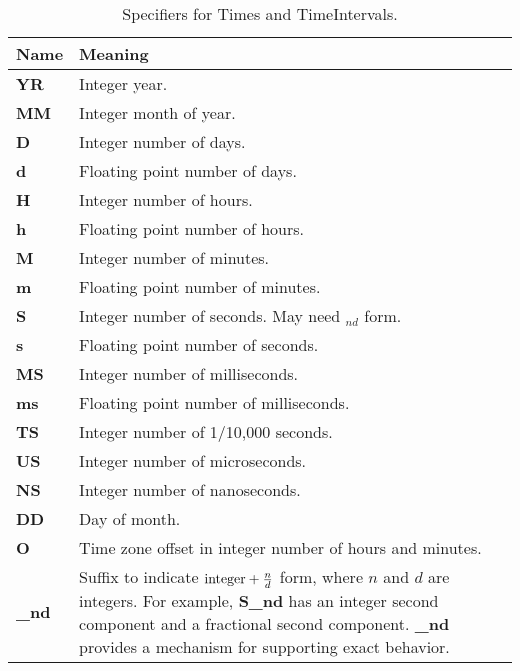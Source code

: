 \begin{center}
\begin{table}
\caption{\label{time-abbrevs}Specifiers for Times and TimeIntervals.}
\begin{tabular}{|p{1in}|p{3.5in}|}
\hline
Name & Meaning \\
\hline\hline
{\bf YR} & Integer year. \\
\hline
{\bf MM} & Integer month of year. \\
\hline
{\bf D} & Integer number of days. \\
\hline
{\bf d} & Floating point number of days. \\
\hline
{\bf H} & Integer number of hours. \\
\hline
{\bf h} & Floating point number of hours. \\
\hline
{\bf M} & Integer number of minutes. \\
\hline
{\bf m} & Floating point number of minutes. \\
\hline
{\bf S} & Integer number of seconds. May need $_{nd}$ form.\\
\hline
{\bf s} & Floating point number of seconds. \\
\hline
{\bf MS} & Integer number of milliseconds. \\
\hline
{\bf ms} & Floating point number of milliseconds. \\
\hline
{\bf TS} & Integer number of 1/10,000 seconds. \\
\hline
{\bf US} & Integer number of microseconds. \\
\hline
{\bf NS} & Integer number of nanoseconds. \\
\hline
{\bf DD} & Day of month. \\
\hline
{\bf O} & Time zone offset in integer number of hours and minutes. \\
\hline
{\bf \_nd} & Suffix to indicate {\bf $ {\rm integer} + \frac{n}{d}$} form,
where $n$ and $d$ are integers. For example, {\bf S\_nd} has an integer
second component and a fractional second component. {\bf \_nd} provides 
a mechanism for supporting exact behavior.
\\
\hline
\end{tabular}
\end{table}
\end{center}






